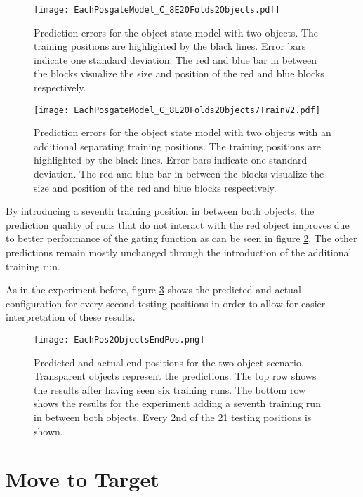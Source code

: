 \begin{figure}[H]
\centering
\texttt{[image: EachPosgateModel\_C\_8E20Folds2Objects.pdf]}
\caption{Prediction errors for the object state model with two objects. The training positions are highlighted by the black lines. Error bars indicate one standard deviation. The red and blue bar in between the blocks visualize the size and position of the red and blue blocks respectively.}
\label{fig:eachPosTwoObjects}
\end{figure}

\begin{figure}[H]
\centering
\texttt{[image: EachPosgateModel\_C\_8E20Folds2Objects7TrainV2.pdf]}
\caption{Prediction errors for the object state model with two objects with an additional separating training positions. The training positions are highlighted by the black lines. Error bars indicate one standard deviation. The red and blue bar in between the blocks visualize the size and position of the red and blue blocks respectively.}
\label{fig:eachPosTwoObjects7Trains}
\end{figure}

By introducing a seventh training position in between both objects, the prediction quality of runs that do not interact with the red object improves due to better performance of the gating function as can be seen in figure \ref{fig:eachPosTwoObjects7Trains}. The other predictions remain mostly unchanged through the introduction of the additional training run.


As in the experiment before, figure \ref{fig:eachPosTwoObjectsEndPos} shows the predicted and actual configuration for every second testing positions in order to allow for easier interpretation of these results.



\begin{figure}[h]
\centering
\texttt{[image: EachPos2ObjectsEndPos.png]}
\caption{Predicted and actual end positions for the two object scenario. Transparent objects represent the predictions. The top row shows the results after having seen six training runs. The bottom row shows the results for the experiment adding a seventh training run in between both objects. Every 2nd of the 21 testing positions is shown.}
\label{fig:eachPosTwoObjectsEndPos}
\end{figure}


\section{Move to Target \label{sec:moveToTarget}}

